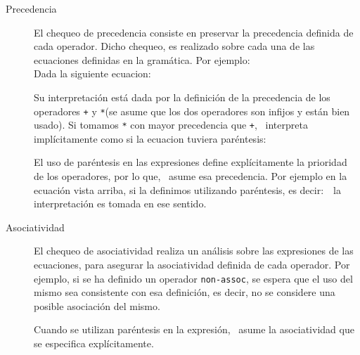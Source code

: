 \begin{description}
\item [Precedencia] El chequeo de precedencia consiste en preservar la precedencia definida de cada operador. Dicho chequeo, es realizado sobre cada una de las ecuaciones definidas en la gramática. Por ejemplo:\\ Dada la siguiente ecuacion: 
\begin{center}
\end{center}
Su interpretación está dada por la definición de la precedencia de los operadores \texttt{+} y \texttt{*}(se asume que los dos operadores son infijos y están bien usado). Si tomamos \texttt{*} con mayor precedencia que \texttt{+}, \maggen\ interpreta implícitamente como si la ecuacion tuviera paréntesis:
\begin{center}
\end{center}

El uso de paréntesis en las expresiones define explícitamente la prioridad de los operadores, por lo que, \maggen\ asume esa precedencia. Por ejemplo en la ecuación vista arriba, si la definimos utilizando paréntesis, es decir:\  
 \ la interpretación es tomada en ese sentido.

\item [Asociatividad] El chequeo de asociatividad realiza un análisis sobre las expresiones de las ecuaciones, para asegurar la asociatividad definida de cada operador. Por ejemplo, si se ha definido un operador \texttt{non-assoc}, se espera que el uso del mismo sea consistente con esa definición, es decir, no se considere una posible asociación del mismo. 

Cuando se utilizan paréntesis en la expresión, \maggen\ asume la asociatividad que se especifica explícitamente.


\end{description}
